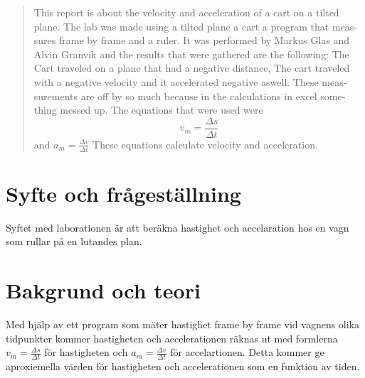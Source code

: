 \documentclass[11p, titlepage, oneside, a4paper]{article}
\begin{document}
    \begin{otherlanguage}{english}
	\begin{abstract}
		This report is about the velocity and acceleration of a cart on a tilted plane. The lab was made using a tilted plane a cart a program that meassures frame by frame and a ruler. It was performed by Markus Glas and Alvin Granvik and the results that were gathered are the following: The Cart traveled on a plane that had a negative distance, The cart traveled with a negative velocity and it accelerated negative aswell. These meassurements are off by so much because in the calculations in excel something messed up. The equations that were used were \begin{equation}
																																																																																																																																												   v_m = \frac{\Delta s}{\Delta t}
		\end{equation} and $a_m = \frac{\Delta v}{\Delta t}$ These equations calculate velocity and acceleration.
    \end{abstract}
    \end{otherlanguage}
	\tableofcontents
	
	\newpage

	
	\setlength{\parindent}{0pt}
	\setlength{\parskip}{10pt}
	
	\section{Syfte och frågeställning}
		Syftet med laborationen är att beräkna hastighet och accelaration hos en vagn som rullar på en lutandes plan.

	\section{Bakgrund och teori}
        Med hjälp av ett program som mäter hastighet frame by frame vid vagnens olika tidpunkter kommer hastigheten och accelerationen räknas ut med formlerna $v_m = \frac{\Delta s}{\Delta t}$ för hastigheten och $a_m = \frac{\Delta v}{\Delta t}$ för accelartionen. Detta kommer ge aproxiemella värden för hastigheten och accelerationen som en funktion av tiden.
\end{document}

